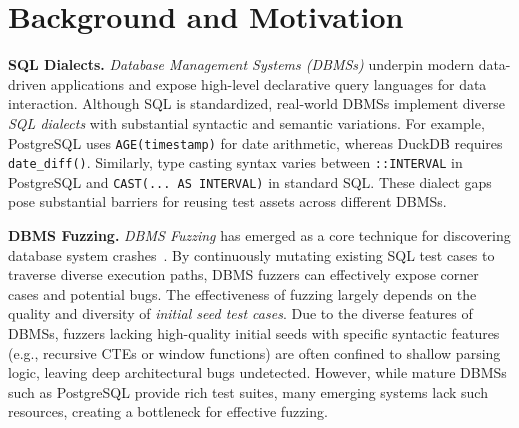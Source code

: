 \documentclass[conference]{IEEEtran}
\begin{document}
\section{Background and Motivation}
\label{sec:background}
\textbf{SQL Dialects.} 
\textit{Database Management Systems (DBMSs)} underpin modern data-driven applications and expose high-level declarative query languages for data interaction. Although SQL is standardized, real-world DBMSs implement diverse \textit{SQL dialects} with substantial syntactic and semantic variations.
For example, PostgreSQL uses \texttt{AGE(timestamp)} for date arithmetic, whereas DuckDB requires \texttt{date\_diff()}. Similarly, type casting syntax varies between \texttt{::INTERVAL} in PostgreSQL and \texttt{CAST(... AS INTERVAL)} in standard SQL. 
These dialect gaps pose substantial barriers for reusing test assets across different DBMSs.



\textbf{DBMS Fuzzing.} 
\textit{DBMS Fuzzing} has emerged as a core technique for discovering database system crashes~\cite{sqlsmith, zhong2020squirrel, wang2021industry}. By continuously mutating existing SQL test cases to traverse diverse execution paths, DBMS fuzzers can effectively expose corner cases and potential bugs.
The effectiveness of fuzzing largely depends on the quality and diversity of \textit{initial seed test cases}.
Due to the diverse features of DBMSs, fuzzers lacking high-quality initial seeds with specific syntactic features (e.g., recursive CTEs or window functions) are often confined to shallow parsing logic, leaving deep architectural bugs undetected.
However, while mature DBMSs such as PostgreSQL provide rich test suites, many emerging systems lack such resources, creating a bottleneck for effective fuzzing.
\end{document}
